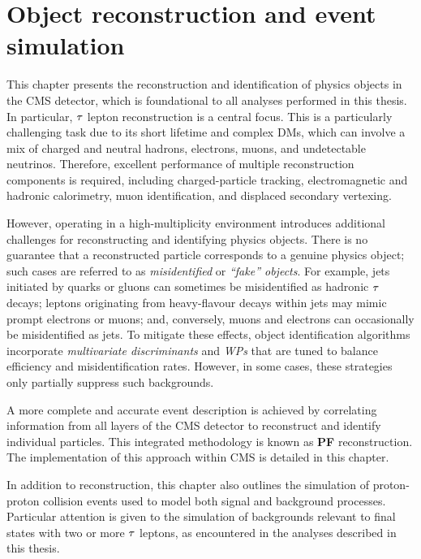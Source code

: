 \chapter{Object reconstruction and event simulation}
\thispagestyle{plain}  %
\pagestyle{chapterpages}
\label{Section:Chapter4}
\minitoc

This chapter presents the reconstruction and identification of physics objects in the \ac{CMS} detector, which is foundational to all analyses performed in this thesis. In particular, $\tau$ lepton reconstruction is a central focus. This is a particularly challenging task due to its short lifetime and complex \acp{DM}, which can involve a mix of charged and neutral hadrons, electrons, muons, and undetectable neutrinos. Therefore, excellent performance of multiple reconstruction components is required, including charged-particle tracking, electromagnetic and hadronic calorimetry, muon identification, and displaced secondary vertexing.

However, operating in a high-multiplicity environment introduces additional challenges for reconstructing and identifying physics objects. There is no guarantee that a reconstructed particle corresponds to a genuine physics object; such cases are referred to as \textit{misidentified} or \textit{``fake'' objects}. For example, jets initiated by quarks or gluons can sometimes be misidentified as hadronic $\tau$ decays; leptons originating from heavy-flavour decays within jets may mimic prompt electrons or muons; and, conversely, muons and electrons can occasionally be misidentified as jets. To mitigate these effects, object identification algorithms incorporate \textit{multivariate discriminants} and \textit{\acp{WP}} that are tuned to balance efficiency and misidentification rates. However, in some cases, these strategies only partially suppress such backgrounds.

A more complete and accurate event description is achieved by correlating information from all layers of the \ac{CMS} detector to reconstruct and identify individual particles. This integrated methodology is known as \textbf{\ac{PF}} reconstruction. The implementation of this approach within \ac{CMS} is detailed in this chapter.

In addition to reconstruction, this chapter also outlines the simulation of proton-proton collision events used to model both signal and background processes. Particular attention is given to the simulation of backgrounds relevant to final states with two or more $\tau$ leptons, as encountered in the analyses described in this thesis.

